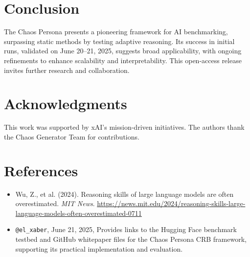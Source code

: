 \documentclass[11pt,a4paper]{article}
\begin{document}
\section{Conclusion}
The Chaos Persona presents a pioneering framework for AI benchmarking, surpassing static methods by testing adaptive reasoning. Its success in initial runs, validated on June 20–21, 2025, suggests broad applicability, with ongoing refinements to enhance scalability and interpretability. This open-access release invites further research and collaboration.

\section*{Acknowledgments}
This work was supported by xAI's mission-driven initiatives. The authors thank the Chaos Generator Team for contributions.

\section*{References}
\begin{itemize}
    \item Wu, Z., et al. (2024). Reasoning skills of large language models are often overestimated. \textit{MIT News}. \url{https://news.mit.edu/2024/reasoning-skills-large-language-models-often-overestimated-0711}
    \item \texttt{@el_xaber}, June 21, 2025, Provides links to the Hugging Face benchmark testbed and GitHub whitepaper files for the Chaos Persona CRB framework, supporting its practical implementation and evaluation.
\end{itemize}
\end{document}
